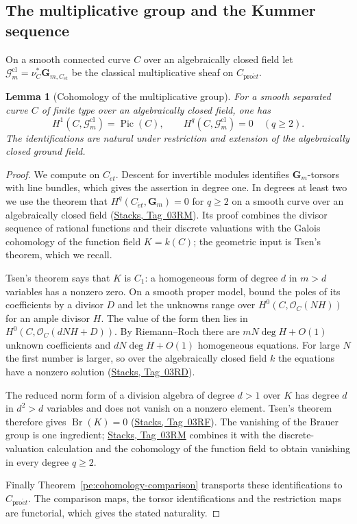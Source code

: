 \documentclass[11pt,a4paper]{article}
\numberwithin{equation}{section}
\newtheorem{lemma}[theorem]{Lemma}
\theoremstyle{definition}
\theoremstyle{remark}
\newcommand{\et}{\acute{e}t}
\newcommand{\proet}{\mathrm{pro}\acute{e}t}
\newcommand{\stacks}[1]{\href{https://stacks.math.columbia.edu/tag/#1}{\textnormal{Stacks, Tag~#1}}}
\newcommand{\cO}{\mathcal O}
\begin{document}
\subsection{The multiplicative group and the Kummer sequence}

On a smooth connected curve $C$ over an algebraically closed field let
$\mathcal G_m^{\mathrm{cl}}=\nu_C^*\mathbf G_{m,C_{\et}}$ be the
classical multiplicative sheaf on $C_{\proet}$.

\begin{lemma}[Cohomology of the multiplicative group]
\label{app:curve-gm}
For a smooth separated curve $C$ of finite type over an algebraically
closed field, one has
\[
 H^1(C,\mathcal G_m^{\mathrm{cl}})=\operatorname{Pic}(C),
 \qquad
 H^q(C,\mathcal G_m^{\mathrm{cl}})=0\quad(q\geq2).
\]
The identifications are natural under restriction and extension of
the algebraically closed ground field.
\end{lemma}
\begin{proof}
We compute on $C_{\et}$.  Descent for invertible modules identifies
$\mathbf G_m$-torsors with line bundles, which gives the assertion in
degree one.  In degrees at least two we use the theorem that
$H^q(C_{\et},\mathbf G_m)=0$ for $q\geq2$ on a smooth curve over an
algebraically closed field (\stacks{03RM}).  Its proof combines the
divisor sequence of rational functions and their discrete valuations
with the Galois cohomology of the function field $K=k(C)$; the
geometric input is Tsen's theorem, which we recall.

Tsen's theorem says that $K$ is $C_1$: a homogeneous form of degree
$d$ in $m>d$ variables has a nonzero zero.  On a smooth proper model,
bound the poles of its coefficients by a divisor $D$ and let the
unknowns range over $H^0(C,\cO_C(NH))$ for an ample divisor $H$.  The
value of the form then lies in $H^0(C,\cO_C(dNH+D))$.  By
Riemann--Roch there are $mN\deg H+O(1)$ unknown coefficients and
$dN\deg H+O(1)$ homogeneous equations.  For large $N$ the first number
is larger, so over the algebraically closed field $k$ the equations
have a nonzero solution (\stacks{03RD}).

The reduced norm form of a division algebra of degree $d>1$ over $K$
has degree $d$ in $d^2>d$ variables and does not vanish on a nonzero
element.  Tsen's theorem therefore gives $\operatorname{Br}(K)=0$
(\stacks{03RF}).  The vanishing of the Brauer group is one ingredient;
\stacks{03RM} combines it with the discrete-valuation calculation and
the cohomology of the function field to obtain vanishing in every
degree $q\geq2$.

Finally Theorem~\ref{pe:cohomology-comparison} transports these
identifications to $C_{\proet}$.  The comparison maps, the torsor
identifications and the restriction maps are functorial, which gives
the stated naturality.
\end{proof}
\end{document}
